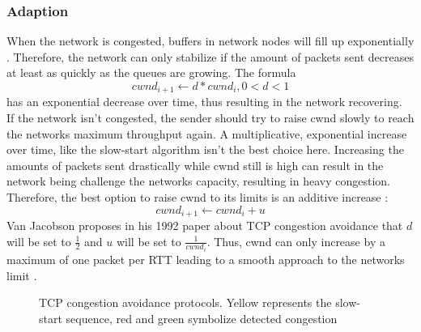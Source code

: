 \documentclass[a4paper,conference]{IEEEtran}
\begin{document}
\subsubsection*{Adaption}
When the network is congested, buffers in network nodes will fill up exponentially \cite{jacobson1992tcp}. Therefore, the network can only stabilize if the amount of packets sent decreases at least as quickly as the queues are growing. The formula \cite{jacobson1992tcp} \[cwnd_{i+1} \leftarrow d*cwnd_{i}, 0<d<1\] has an exponential decrease over time, thus resulting in the network recovering.\\
If the network isn't congested, the sender should try to raise cwnd slowly to reach the networks maximum throughput again. A multiplicative, exponential increase over time, like the slow-start algorithm isn't the best choice here. Increasing the amounts of packets sent drastically while cwnd still is high can result in the network being challenge the networks capacity, resulting in heavy congestion. Therefore, the best option to raise cwnd to its limits is an additive increase \cite{jacobson1992tcp}:\[cwnd_{i+1} \leftarrow cwnd_{i} + u\] Van Jacobson proposes in his 1992 paper about TCP congestion avoidance that $d$ will be set to $\frac{1}{2}$ and $u$ will be set to $\frac{1}{cwnd_{i}}$. Thus, cwnd can only increase by a maximum of one packet per RTT leading to a smooth approach to the networks limit \cite{jacobson1992tcp}.

\begin{figure}
  \centering
  \caption{TCP congestion avoidance protocols. Yellow represents the slow-start sequence, red and green symbolize detected congestion}
  \label{fig:tcp_congestion_avoidance_protocols}
\end{figure}
\end{document}
